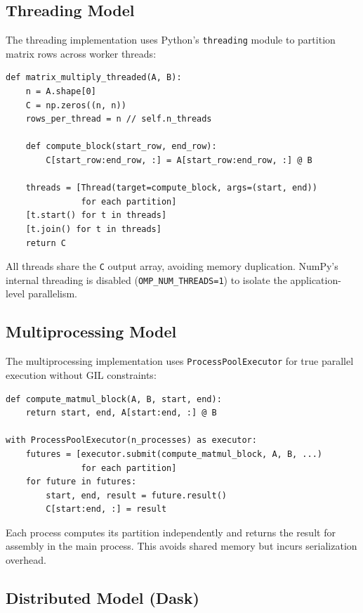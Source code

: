 \subsection{Threading Model}

The threading implementation uses Python's \texttt{threading} module to partition matrix rows across worker threads:

\begin{verbatim}
def matrix_multiply_threaded(A, B):
    n = A.shape[0]
    C = np.zeros((n, n))
    rows_per_thread = n // self.n_threads
    
    def compute_block(start_row, end_row):
        C[start_row:end_row, :] = A[start_row:end_row, :] @ B
    
    threads = [Thread(target=compute_block, args=(start, end))
               for each partition]
    [t.start() for t in threads]
    [t.join() for t in threads]
    return C
\end{verbatim}

All threads share the \texttt{C} output array, avoiding memory duplication. NumPy's internal threading is disabled (\texttt{OMP\_NUM\_THREADS=1}) to isolate the application-level parallelism.

\subsection{Multiprocessing Model}

The multiprocessing implementation uses \texttt{ProcessPoolExecutor} for true parallel execution without GIL constraints:

\begin{verbatim}
def compute_matmul_block(A, B, start, end):
    return start, end, A[start:end, :] @ B

with ProcessPoolExecutor(n_processes) as executor:
    futures = [executor.submit(compute_matmul_block, A, B, ...)
               for each partition]
    for future in futures:
        start, end, result = future.result()
        C[start:end, :] = result
\end{verbatim}

Each process computes its partition independently and returns the result for assembly in the main process. This avoids shared memory but incurs serialization overhead.

\subsection{Distributed Model (Dask)}

